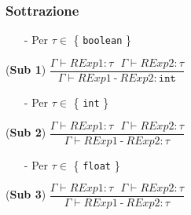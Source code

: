 \documentclass[12pt]{article}
\begin{document}
\subsubsection*{Sottrazione}

\begin{center}

\begin{itemize}
\item[-] Per $\tau \in$ \{ \texttt{boolean} \}
\end{itemize}
\noindent(\textbf{Sub 1})
$\dfrac{\Gamma \vdash RExp1:\tau\ \ \ \Gamma \vdash RExp2:\tau}{\Gamma \vdash RExp1\ \texttt{-}\ RExp2:\texttt{int}}$\\[0.1in]

\begin{itemize}
\item[-] Per $\tau \in$ \{ \texttt{int} \}
\end{itemize}
\noindent(\textbf{Sub 2})
$\dfrac{\Gamma \vdash RExp1:\tau\ \ \ \Gamma \vdash RExp2:\tau}{\Gamma \vdash RExp1\ \texttt{-}\ RExp2:\tau}$\\[0.1in]

\begin{itemize}
\item[-] Per $\tau \in$ \{ \texttt{float} \}
\end{itemize}
\noindent(\textbf{Sub 3})
$\dfrac{\Gamma \vdash RExp1:\tau\ \ \ \Gamma \vdash RExp2:\tau}{\Gamma \vdash RExp1\ \texttt{-}\ RExp2:\tau}$\\[0.1in]
\end{center}
\end{document}
